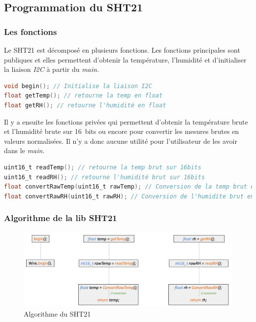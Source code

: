         \subsection{Programmation du SHT21}
            \subsubsection{Les fonctions}


            Le SHT21 est décomposé en plusieurs fonctions. Les fonctions principales sont publiques et elles permettent d'obtenir la température, l'humidité et d'initialiser la liaison \textit{I2C} à partir du \textit{main}. 

\begin{lstlisting}[style=myC, caption=Fonctions publiques de la librairie SHT21, language=C, frame=lines]
void begin(); // Initialise la liaison I2C
float getTemp(); // retourne la temp en float
float getRH(); // retourne l'humidité en float
\end{lstlisting}

        \vspace{.5 cm}

        Il y a ensuite les fonctions privées qui permettent d'obtenir la température brute et l'humidité brute sur 16~bits ou encore pour convertir les mesures brutes en valeurs normalisées. Il n'y a donc aucune utilité pour l'utilisateur de les avoir dans le \textit{main.}

\begin{lstlisting}[style=myC, caption=Fonctions privées de la librairie SHT21, language=C, frame=lines]
uint16_t readTemp(); // retourne la temp brut sur 16bits
uint16_t readRH(); // retourne l'humidité brut sur 16bits
float convertRawTemp(uint16_t rawTemp); // Conversion de la temp brut en float
float convertRawRH(uint16_t rawRH); // Conversion de l'humidite brut en float 
\end{lstlisting}

        \subsubsection{Algorithme de la lib SHT21}

        \begin{figure}[!h]
            \begin{center}
                \includegraphics[width=.65\textwidth]{img/code/algo_sht.png}
                \caption{\label{fig:algo_sht}Algorithme du SHT21}  
            \end{center}
        \end{figure}





